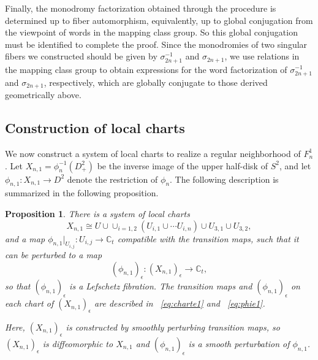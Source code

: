 \documentclass[10pt,a4paper,reqno]{amsart}
\newtheorem{prop}[thm]{Proposition}
\theoremstyle{definition}
\numberwithin{equation}{section}
\numberwithin{figure}{section}
\newcommand{\C}{\mathbb{C}}
\newcommand{\ep}{\epsilon}
\newcommand{\arrowr}{\rightarrow}
\begin{document}
Finally, the monodromy factorization obtained through the procedure is determined up to fiber automorphism, 
equivalently, up to global conjugation from the viewpoint of words in the mapping class group.
So this global conjugation must be identified to complete the proof.
Since the monodromies of two singular fibers we constructed should be given by $\sigma_{2n+1}^{-1}$ and $\sigma_{2n+1}$, 
we use relations in the mapping class group to obtain expressions for the word factorization of $\sigma_{2n+1}^{-1}$ and $\sigma_{2n+1}$, respectively, which are globally conjugate to those derived geometrically above.

\subsection{Construction of local charts}
We now construct a system of local charts to realize a regular neighborhood of $F^1_{n}$.
Let $X_{n,1}= \phi^{-1}_{n}(D^2_+)$ be the inverse image of the upper half-disk of $S^2$, and
let $\phi_{n,1}: X_{n,1} \arrowr D^2$ denote the restriction of $\phi_{n}$.
The following description is summarized in the following proposition.

\begin{prop} \label{prop:charts1}
There is a system of local charts
\[X_{n,1} \cong U\cup \cup_{i=1,2}(U_{i,1}\cup \cdots U_{i,n}) \cup U_{3,1} \cup U_{3,2},\]
and a map $\phi_{n,1}|_{U_{i,j}}:U_{i,j} \arrowr \C_t$ compatible with the transition maps,
such that it can be perturbed to a map
\[(\phi_{n,1})_\ep: (X_{n,1})_\ep \arrowr \C_t,\]
so that $(\phi_{n,1})_\ep$ is a Lefschetz fibration.
The transition maps and $(\phi_{n,1})_\ep$ on each chart of $(X_{n,1})_\ep$ are described in ~\eqref{eq:charte1} and ~\eqref{eq:phie1}.

Here, $(X_{n,1})_\ep$ is constructed by smoothly perturbing transition maps, so $(X_{n,1})_\ep$ is diffeomorphic to $X_{n,1}$ and $(\phi_{n,1})_\ep$ is a smooth perturbation of $\phi_{n,1}$.
\end{prop}
\end{document}
